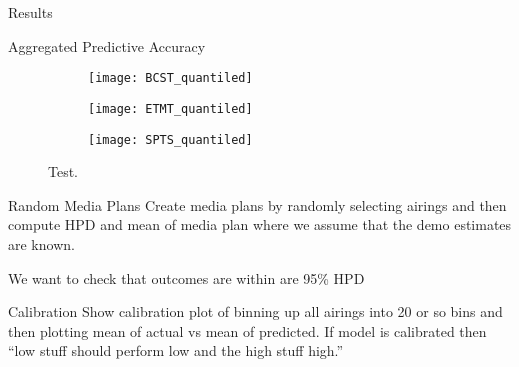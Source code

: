 \begin{chapter}{Results}
\begin{section}{Aggregated Predictive Accuracy}
    \begin{figure}[!h]
      \centering
      \begin{subfigure}[b]{.75\textwidth}
        \centering
        \texttt{[image: BCST\_quantiled]}
      \end{subfigure}
      \begin{subfigure}[b]{.75\textwidth}
        \centering
        \texttt{[image: ETMT\_quantiled]}
      \end{subfigure}
      \begin{subfigure}[b]{.75\textwidth}
        \centering
        \texttt{[image: SPTS\_quantiled]}
      \end{subfigure}
      \caption{Test.}
      \label{fig:quantiledoutcomes}
    \end{figure}

    \begin{subsection}{Random Media Plans}
      Create media plans by randomly selecting airings and then compute HPD and mean
      of media plan where we assume that the demo estimates are known.

      We want to check that outcomes are within are 95\% HPD
    \end{subsection}

    \begin{subsection}{Calibration}
      Show calibration plot of binning up all airings into 20 or so bins
      and then plotting mean of actual vs mean of predicted. If model is calibrated
      then ``low stuff should perform low and the high stuff high.''
    \end{subsection}
  \end{section}
\end{chapter}